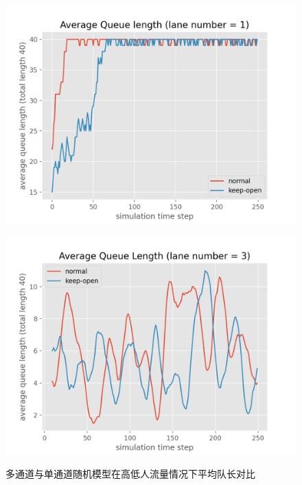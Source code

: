 \begin{figure}[ht]
\begin{minipage}[c]{0.45\textwidth}
        \includegraphics[width=.9\textwidth]{images/queue_length_poisson_one_lane_high.png}
        \label{fig:one-lane-high-poisson}
    \end{minipage}
    \begin{minipage}[c]{0.45\textwidth}
        \centering
        \includegraphics[width=.9\textwidth]{images/queue_length_poisson_three_lane_high_ma.png}
        \label{fig:three-lane-high-poisson}
    \end{minipage}
    \caption{多通道与单通道随机模型在高低人流量情况下平均队长对比}
    \label{fig:model-three-result}
\end{figure}

